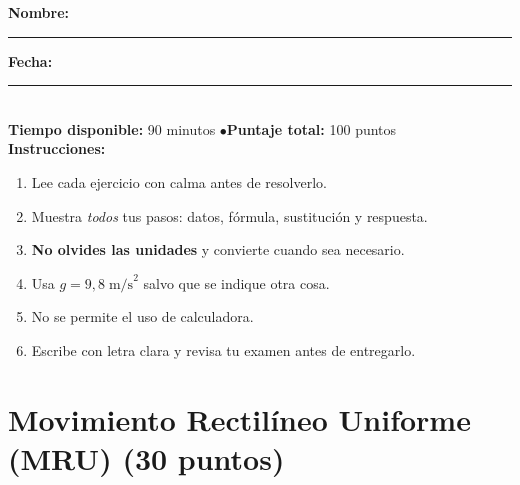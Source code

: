 \documentclass[12pt, letterpaper]{article}
\begin{document}


\vspace{4pt}
\begin{cuadroinfo}
  \small
  \textbf{Nombre:} \rule{0.55\linewidth}{0.4pt} \quad \textbf{Fecha:} \rule{0.15\linewidth}{0.4pt} \\[6pt]
  \textbf{Tiempo disponible:} 90 minutos \quad$\bullet$\quad \textbf{Puntaje total:} 100 puntos \\[4pt]
  \textbf{Instrucciones:}
  \begin{enumerate}[leftmargin=*]
    \item Lee cada ejercicio con calma antes de resolverlo.
    \item Muestra \emph{todos} tus pasos: datos, fórmula, sustitución y respuesta.
    \item \textbf{No olvides las unidades} y convierte cuando sea necesario.
    \item Usa $g = 9{,}8\;\text{m/s}^2$ salvo que se indique otra cosa.
    \item No se permite el uso de calculadora.
    \item Escribe con letra clara y revisa tu examen antes de entregarlo.
  \end{enumerate}
\end{cuadroinfo}

\vspace{8pt}

\section{Movimiento Rectilíneo Uniforme (MRU) (30 puntos)}
\end{document}

